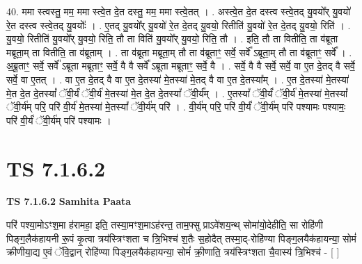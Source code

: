 \documentclass[17pt]{extarticle}
\begin{document}
40. ममा स्त्वस्तु॒ मम॒ ममा स्त्वे॒त दे॒त दस्तु॒ मम॒ ममा स्त्वे॒तत् । . अस्त्वे॒त दे॒त दस्त्व स्त्वे॒तद् यु॒वयो᳚र् यु॒वयो॑ रे॒त दस्त्व स्त्वे॒तद् यु॒वयोः᳚ । . ए॒तद् यु॒वयो᳚र् यु॒वयो॑ रे॒त दे॒तद् यु॒वयो॒ रितीति॑ यु॒वयो॑ रे॒त दे॒तद् यु॒वयो॒ रिति॑ । . यु॒वयो॒ रितीति॑ यु॒वयो᳚र् यु॒वयो॒ रिति॒ तौ ता विति॑ यु॒वयो᳚र् यु॒वयो॒ रिति॒ तौ । . इति॒ तौ ता वितीति॒ ता व॑ब्रूता मब्रूता॒म् ता वितीति॒ ता व॑ब्रूताम् । . ता व॑ब्रूता मब्रूता॒म् तौ ता व॑ब्रूताꣳ॒॒ सर्वे॒ सर्वे᳚ ऽब्रूता॒म् तौ ता व॑ब्रूताꣳ॒॒ सर्वे᳚ । . अ॒ब्रू॒ताꣳ॒॒ सर्वे॒ सर्वे᳚ ऽब्रूता मब्रूताꣳ॒॒ सर्वे॒ वै वै सर्वे᳚ ऽब्रूता मब्रूताꣳ॒॒ सर्वे॒ वै । . सर्वे॒ वै वै सर्वे॒ सर्वे॒ वा ए॒त दे॒तद् वै सर्वे॒ सर्वे॒ वा ए॒तत् । . वा ए॒त दे॒तद् वै वा ए॒त दे॒तस्या॑ मे॒तस्या॑ मे॒तद् वै वा ए॒त दे॒तस्या᳚म् । . ए॒त दे॒तस्या॑ मे॒तस्या॑ मे॒त दे॒त दे॒तस्यां᳚ ॅवी॒र्यं॑ ॅवी॒र्य॑ मे॒तस्या॑ मे॒त दे॒त दे॒तस्यां᳚ ॅवी॒र्य᳚म् । . ए॒तस्यां᳚ ॅवी॒र्यं॑ ॅवी॒र्य॑ मे॒तस्या॑ मे॒तस्यां᳚ ॅवी॒र्य॑म् परि॒ परि॑ वी॒र्य॑ मे॒तस्या॑ मे॒तस्यां᳚ ॅवी॒र्य॑म् परि॑ । . वी॒र्य॑म् परि॒ परि॑ वी॒र्यं॑ ॅवी॒र्य॑म् परि॑ पश्यामः पश्यामः॒ परि॑ वी॒र्यं॑ ॅवी॒र्य॑म् परि॑ पश्यामः । \newline
\pagebreak
{}

\section{ TS 7.1.6.2 }

\textbf{TS 7.1.6.2 } \newline
\textbf{Samhita Paata} \newline

परि॑ पश्या॒मोऽꣳश॒मा ह॑रामहा॒ इति॒ तस्या॒मꣳश॒माऽह॑रन्त॒ ताम॒फ्सु प्राऽवे॑शय॒न्थ् सोमा॑यो॒देहीति॒ सा रोहि॑णी पिङ्ग॒लैक॑हायनी रू॒पं कृ॒त्वा त्रय॑स्त्रिꣳशता च त्रि॒भिश्च॑ श॒तैः स॒होदैत् तस्मा॒द्-रोहि॑ण्या पिङ्ग॒लयैक॑हायन्या॒ सोमं॑ क्रीणीया॒द्य ए॒वं ॅवि॒द्वान् रोहि॑ण्या पिङ्ग॒लयैक॑हायन्या॒ सोमं॑ क्री॒णाति॒ त्रय॑स्त्रिꣳशता चै॒वास्य॑ त्रि॒भिश्च॑ - [  ] \newline
\end{document}

